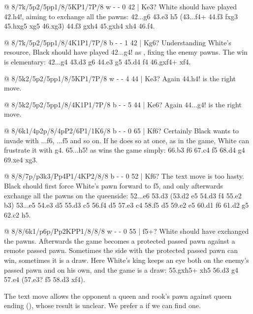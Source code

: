 @ 8/7k/5p2/5pp1/8/5KP1/7P/8 w - - 0 42 | Ke3?
White should have played 42.h4!, aiming to exchange all the pawns:
42...\K g6 43.\K e3 \K h5 (43...f4+ 44.\K f3 fxg3 45.hxg5 \K xg5 46.\K xg3) 44.\K f3 gxh4 45.gxh4
\K xh4 46.\K f4.

@ 8/7k/5p2/5pp1/8/4K1P1/7P/8 b - - 1 42 | Kg6?
Understanding White's resource, Black should have played 42...g4! as
, fixing the enemy pawns. The win is elementary:
42...g4 43.\K d3 \K g6 44.\K e3 \K g5 45.\K d4 f4 46.gxf4+ \K xf4.

@ 8/5k2/5p2/5pp1/8/5KP1/7P/8 w - - 4 44 | Ke3?
Again 44.h4! is the right move.

@ 8/5k2/5p2/5pp1/8/4K1P1/7P/8 b - - 5 44 | Ke6?
Again 44...g4! is the right move.

@ 8/6k1/4p2p/8/4pP2/6P1/1K6/8 b - - 0 65 | Kf6?
Certainly Black wants to invade with ...\K f6, ...\K f5 and so on. If he does so at once, as in the
game, White can frustrate it with g4. 65...h5! as  wins
the game simply: 66.\K b3 \K f6 67.\K c4 \K f5 68.\K d4 \K g4 69.\K xe4 \K xg3.

@ 8/8/7p/p3k3/Pp4P1/4KP2/8/8 b - - 0 52 | Kf6?
The text move is too hasty. Black should first force White's pawn forward to f5, and only afterwards
exchange all the pawns on the queenside: 52...\K e6 53.\K d3 (53.\K d2 \K e5 54.\K d3 \K f4 55.\K e2
b3) 53...\K e5 54.\K e3 \K d5 55.\K d3 \K c5 56.f4 \K d5 57.\K e3 \K c4 58.f5 \K d5 59.\K e2 \K e5
60.\K d1 \K f6 61.\K d2 \K g5 62.\K c2 h5.

@ 8/8/6k1/p6p/Pp2KPP1/8/8/8 w - - 0 55 | f5+?
White should have exchanged the pawns. Afterwards the game becomes a protected passed pawn against a
remote passed pawn. Sometimes the side with the
protected passed pawn can win, sometimes it is a draw. Here White's king keeps an eye both on the
enemy's passed pawn and on his own, and the game is a draw: 55.gxh5+ \K xh5 56.\K d3 \K g4 57.\K e4
(57.\K e3? \K f5 58.\K d3 \K xf4).

The text move allows the opponent a queen and rook's pawn against queen ending
(), whose result is
unclear. We prefer a  if we can find one.

